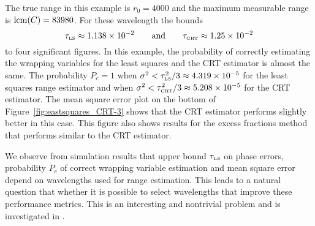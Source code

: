The true range in this example is $r_0 = 4000$ and the maximum measurable range is $\operatorname{lcm}(C) = 83980$. 
For these wavelength the bounds 
\[
\tau_{\text{\tiny{LS}}} \approx 1.138 \times 10^{-2} \qquad \text{and} \qquad \tau_{\text{\tiny{CRT}}} \approx 1.25 \times 10^{-2}
\]
to four significant figures. In this example, the probability of correctly estimating the wrapping variables for the least squares and the CRT estimator is almost the same. The probability $P_c = 1$ when $\sigma^2 < \tau_{\text{\tiny{LS}}}^2/3 \approx 4.319\times 10^{-5}$ for the least squares range estimator and when $\sigma^2 < \tau_{\text{\tiny{CRT}}}^2/3 \approx 5.208 \times 10^{-5}$ for the CRT estimator. The mean square error plot on the bottom of  Figure~\ref{fig:eastsquares_CRT-3} shows that the CRT estimator performs slightly better in this case. This figure also shows results for the excess fractions method that performs similar to the CRT estimator.

We observe from simulation results that upper bound $\tau_{\text{\tiny{LS}}}$ on phase errors, probability $P_c$ of correct wrapping variable estimation and mean square error depend on wavelengths used for range estimation. This leads to a natural question that whether it is possible to select wavelengths that improve these performance metrics. This is an interesting and nontrivial problem and is investigated in .


